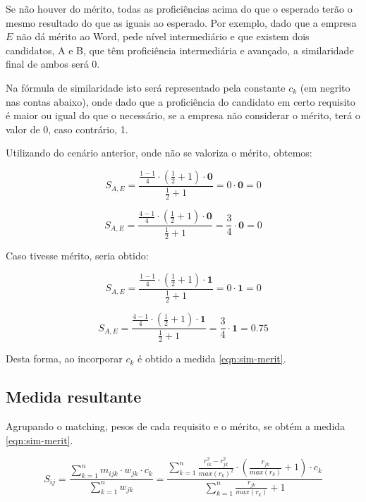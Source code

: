 \documentclass[preprint,12pt]{elsarticle}
\begin{document}
Se não houver do mérito, todas as proficiências acima do que o esperado terão o mesmo resultado do que as iguais ao esperado. Por exemplo, dado que a empresa $E$ não dá mérito ao Word, pede nível intermediário e que existem dois candidatos, A e B, que têm proficiência intermediária e avançado, a similaridade final de ambos será 0.

Na fórmula de similaridade isto será representado pela constante $c_{k}$ (em negrito nas contas abaixo), onde dado que a proficiência do candidato em certo requisito é maior ou igual do que o necessário, se a empresa não considerar o mérito, terá o valor de 0, caso contrário, 1.

Utilizando do cenário anterior, onde não se valoriza o mérito, obtemos:

$$ S_{A,E} = \frac{\tfrac{1 - 1}{4} \cdot (\tfrac{1}{2} + 1) \cdot \textbf{0}}
                  {\tfrac{1}{2} + 1}
           = 0 \cdot \textbf{0} = 0 $$

$$ S_{A,E} = \frac{\tfrac{4 - 1}{4} \cdot (\tfrac{1}{2} + 1) \cdot \textbf{0}}
                  {\tfrac{1}{2} + 1}
           = \frac{3}{4} \cdot \textbf{0} = 0 $$

Caso tivesse mérito, seria obtido:

$$ S_{A,E} = \frac{\tfrac{1 - 1}{4} \cdot (\tfrac{1}{2} + 1) \cdot \textbf{1}}
                  {\tfrac{1}{2} + 1}
           = 0 \cdot \textbf{1} = 0 $$

$$ S_{A,E} = \frac{\tfrac{4 - 1}{4} \cdot (\tfrac{1}{2} + 1) \cdot \textbf{1}}
                  {\tfrac{1}{2} + 1}
           = \frac{3}{4} \cdot \textbf{1} = 0.75 $$
           
Desta forma, ao incorporar $c_{k}$ é obtido a medida \ref{eqn:sim-merit}.

\subsection{Medida resultante}

Agrupando o matching, pesos de cada requisito e o mérito, se obtém a medida \ref{eqn:sim-merit}.

\begin{equation}
\label{eqn:sim-merit}
S_{ij} =  \frac{\sum_{k=1}^n m_{ijk} \cdot w_{jk} \cdot c_k}
               {\sum_{k=1}^n w_{jk}} =
          \frac{\sum_{k=1}^n \frac{r_{ik}^2 - r_{jk}^2}{max(r_k)^2} \cdot (\frac{r_{jk}}{max(r_k)} + 1) \cdot c_{k}}
               {\sum_{k=1}^n {\frac{r_{jk}}{max(r_k)} + 1}}
\end{equation}
\end{document}
